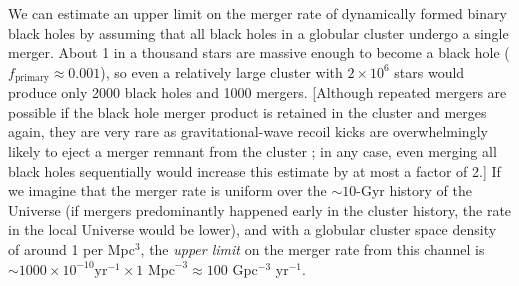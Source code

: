 \documentclass[iop,onecolumn]{revtex4-1}
\begin{document}
We can estimate an upper limit on the merger rate of dynamically formed binary black holes by assuming that all black holes in a globular cluster undergo a single merger.  About 1 in a thousand stars are massive enough to become a black hole ($f_\textrm{primary} \approx 0.001$), so even a relatively large cluster with $2\times 10^6$ stars would produce only 2000 black  holes and 1000 mergers.  [Although repeated mergers are possible if the black hole merger product is retained in the cluster and merges again, they are very rare as gravitational-wave recoil kicks are overwhelmingly likely to eject a merger remnant from the cluster \citep{Rodriguez:2018}; in any case, even merging all black holes sequentially would increase this estimate by at most a factor of 2.]  If we imagine that the merger rate is uniform over the $\sim 10$-Gyr history of the Universe (if mergers predominantly happened early in the cluster history, the rate in the local Universe would be lower), and with a globular cluster space density of around 1 per Mpc$^3$, the {\it upper limit} on the merger rate from this channel is $\sim 1000 \times 10^{-10} \textrm{yr}^{-1} \times 1 \textrm{ Mpc}^{-3} \approx 100$ Gpc$^{-3}$ yr$^{-1}$.
\end{document}
